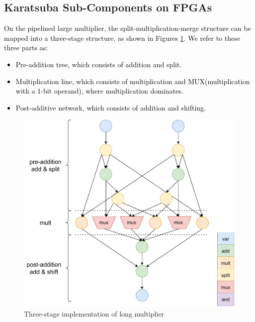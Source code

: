 \documentclass[conference]{IEEEtran}
\begin{document}
\subsection{Karatsuba Sub-Components on FPGAs}    %

\textcolor{black}{
On the pipelined large multiplier, the split-multiplication-merge structure can be mapped into a three-stage structure, as shown in Figures \ref{Figure5}. We refer to these three parts as: 
\begin{itemize}
    \item Pre-addition tree, which consists of addition and split.
    \item Multiplication line, which consists of multiplication and MUX(multiplication with a 1-bit operand), where multiplication dominates.
    \item Post-additive network, which consists of addition and shifting.
\end{itemize}
}

\begin{figure}[htbp]   %
	\centering
	\includegraphics[width=\linewidth,scale=1.00]{fig5.pdf}    %
	\caption{Three-stage implementation of long multiplier}
	\label{Figure5}
\end{figure}
\end{document}
